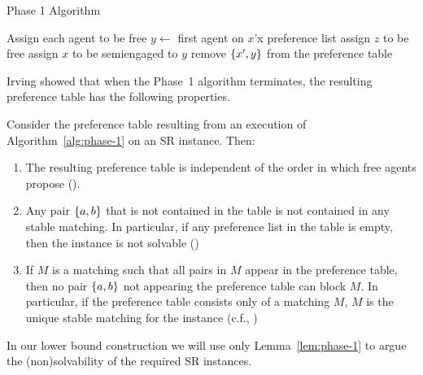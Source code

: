 \begin{algorithm}
    \caption{Phase 1 Algorithm~\cite{Irving1985-stable,GI89} \label{alg:phase-1}}
    \begin{algorithmic}[1]
        \State Assign each agent to be free
        \State $y \gets$ first agent on $x$'x preference list 
        \State assign $z$ to be free 
        \EndIf
        \State assign $x$ to be semiengaged to $y$
        \State remove $\left\{x', y\right\}$ from the preference table \label{ln:remove}
        \EndFor
        \EndWhile
        \EndProcedure
    \end{algorithmic}
\end{algorithm}

Irving showed that when the Phase~1 algorithm terminates, the resulting preference table has the following properties.

\begin{lem}\label{lem:phase-1}
    Consider the preference table resulting from an execution of Algorithm~\ref{alg:phase-1} on an SR instance. Then:
    \begin{enumerate}
        \item The resulting preference table is independent of the order in which free agents propose (\cite[Lemma 4.2.1]{GI89}).
        \item Any pair $\left\{a, b\right\}$ that is not contained in the table is not contained in any stable matching. In particular, if any preference list in the table is empty, then the instance is not solvable (\cite[Lemma~4.2.3]{GI89})
        \item If $M$ is a matching such that all pairs in $M$ appear in the preference table, then no pair $\left\{a, b\right\}$ not appearing the preference table can block $M$. In particular, if the preference table consists only of a matching $M$, $M$ is the unique stable matching for the instance (c.f., \cite[Lemmas~4.2.1 and~4.2.4]{GI89})

    \end{enumerate}
\end{lem}

In our lower bound construction we will use only Lemma~\ref{lem:phase-1} to argue the (non)solvability of the required SR instances.

